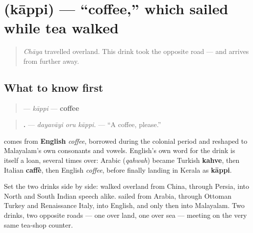 \section[\texorpdfstring{\ml{കാപ്പി} (kāppi)}{കാപ്പി (kāppi)}]{ (kāppi) — \textquotedblleft{}coffee,\textquotedblright{} which sailed while tea walked}

\label{lesson:ML-C39-kaapi}



\begin{quote}
\emph{Chāya} travelled overland. This drink took the opposite road — and arrives from further away.
\end{quote}

\subsection*{What to know first}
\begin{quote}
\textbf{} — \emph{kāppi} — \textbf{coffee}
\end{quote}

\begin{quote}
\textbf{  .} — \emph{dayavāyi oru kāppi.} — \textquotedblleft{}A coffee, please.\textquotedblright{}
\end{quote}

\begin{cousinweb}
\textbf{} comes from \textbf{English} \emph{coffee}, borrowed during the colonial period and reshaped to Malayalam's own consonants and vowels. English's own word for the drink is itself a loan, several times over: Arabic \textbf{} (\emph{qahwah}) became Turkish \textbf{kahve}, then Italian \textbf{caffè}, then English \emph{coffee}, before finally landing in Kerala as \textbf{kāppi}.

Set the two drinks side by side: \textbf{} walked overland from China, through Persia, into North and South Indian speech alike. \textbf{} sailed from Arabia, through Ottoman Turkey and Renaissance Italy, into English, and only then into Malayalam. Two drinks, two opposite roads — one over land, one over sea — meeting on the very same tea-shop counter.
\end{cousinweb}

